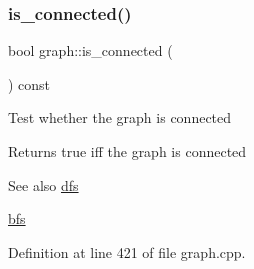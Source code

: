 \subsubsection{\texorpdfstring{is\+\_\+connected()}{is\_connected()}}
{\footnotesize\ttfamily bool graph\+::is\+\_\+connected (\begin{DoxyParamCaption}{ }\end{DoxyParamCaption}) const\hspace{0.3cm}{\ttfamily [inherited]}}

Test whether the graph is connected

\begin{DoxyReturn}{Returns}
true iff the graph is connected 
\end{DoxyReturn}
\begin{DoxySeeAlso}{See also}
\mbox{\hyperlink{classdfs}{dfs}} 

\mbox{\hyperlink{classbfs}{bfs}} 
\end{DoxySeeAlso}


Definition at line 421 of file graph.\+cpp.


